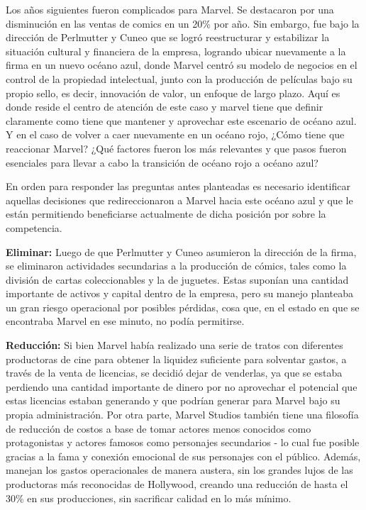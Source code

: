 \documentclass[letterpaper,12pt,oneside]{article}
\begin{document}
Los años siguientes fueron complicados para Marvel. Se destacaron por una disminución en las ventas de comics en un 20\% por año. Sin embargo, fue bajo la dirección de Perlmutter y Cuneo que se logró reestructurar y estabilizar la situación cultural y financiera de la empresa, logrando ubicar nuevamente a la firma en un nuevo océano azul, donde Marvel centró su modelo de negocios en el control de la propiedad intelectual, junto con la producción de películas bajo su propio sello, es decir, innovación de valor, un enfoque de largo plazo. Aquí es donde reside el centro de atención de este caso y marvel tiene que definir claramente como tiene que mantener y aprovechar este escenario de océano azul. Y en el caso de volver a caer nuevamente en un océano rojo, ¿Cómo tiene que reaccionar Marvel? ¿Qué factores fueron los más relevantes y que pasos fueron esenciales para llevar a cabo la transición de océano rojo a océano azul?

En orden para responder las preguntas antes planteadas es necesario identificar aquellas decisiones que redireccionaron a Marvel hacia este océano azul y que le están permitiendo beneficiarse actualmente de dicha posición por sobre la competencia.

\textbf{Eliminar:} Luego de que Perlmutter y Cuneo asumieron la dirección de la firma, se eliminaron actividades secundarias a la producción de cómics, tales como la división de cartas coleccionables y la de juguetes. Estas suponían una cantidad importante de activos y capital dentro de la empresa, pero su manejo planteaba un gran riesgo operacional por posibles pérdidas, cosa que, en el estado en que se encontraba Marvel en ese minuto, no podía permitirse.

\textbf{Reducción:} Si bien Marvel había realizado una serie de tratos con diferentes productoras de cine para obtener la liquidez suficiente para solventar gastos, a través de la venta de licencias, se decidió dejar de venderlas, ya que se estaba perdiendo una cantidad importante de dinero por no aprovechar el potencial que estas licencias estaban generando y que podrían generar para Marvel bajo su propia administración. Por otra parte, Marvel Studios también tiene una filosofía de reducción de costos a base de tomar actores menos conocidos como protagonistas y actores famosos como personajes secundarios - lo cual fue posible gracias a la fama y conexión emocional de sus personajes con el público. Además, manejan los gastos operacionales de manera austera, sin los grandes lujos de las productoras más reconocidas de Hollywood, creando una reducción de hasta el 30\% en sus producciones, sin sacrificar calidad en lo más mínimo.
\end{document}
